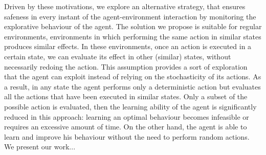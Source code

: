 Driven by these motivations, we explore an alternative strategy, that ensures safeness in every instant of the agent-environment interaction by monitoring the explorative behaviour of the agent. The solution we propose is suitable for regular environments, \ie environments in which performing the same action in similar states produces similar effects. In these environments, once an action is executed in a certain state, we can evaluate its effect in other (similar) states, without necessarily redoing the action. This assumption provides a sort of exploration that the agent can exploit instead of relying on the stochasticity of its actions. As a result, in any state the agent performs only a deterministic action but evaluates all the actions that have been executed in similar states. Only a subset of the possible action is evaluated, then the learning ability of the agent is significantly reduced in this approach: learning an optimal behaviour becomes infeasible or requires an excessive amount of time. On the other hand, the agent is able to learn and improve his behaviour without the need to perform random actions.\\
\newline
We present our work... 
